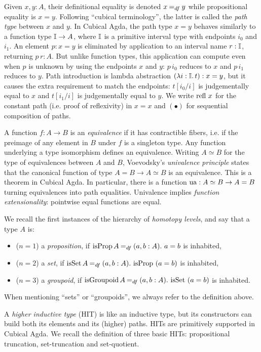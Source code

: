 \documentclass[a4paper,USenglish,cleveref]{lipics-v2021}
\begin{document}
Given $x, y : A$, their definitional equality is denoted $x \DefEq y$ while propositional equality is $x = y$.
Following ``cubical terminology'', the latter is called the \emph{path type} between $x$ and $y$.
In Cubical Agda, the path type $x = y$ behaves similarly to a function type $\mathbb{I} \to A$, where $\mathbb{I}$ is a primitive interval type with endpoints $i_0$ and $i_1$.
An element $p : x = y$ is eliminated by application to an interval name $r : \mathbb{I}$, returning $p \, r : A$.
But unlike function types, this application can compute even when $p$ is unknown by using the endpoints $x$ and $y$: $p \,i_0$ reduces to $x$ and $p \,i_1$ reduces to $y$.
Path introduction is lambda abstraction $(\lambda i : \mathbb{I}.\,t) : x = y$, but it causes the extra requirement to match the endpoints: $t[i_0 / i]$ is judgementally equal to $x$ and $t[i_1 / i]$ is judgementally equal to  $y$. We write $\Refl\,x$ for the constant path (i.e. proof of reflexivity) in $x = x$ and $(\bullet)$ for sequential composition of paths.

A function $f : A \to B$ is an \emph{equivalence} if it has contractible fibers, i.e. if the preimage of any element in $B$ under $f$ is a singleton type. Any function underlying a type isomorphism defines an equivalence. Writing $A \simeq B$ for the type of equivalences between $A$ and $B$, Voevodsky's \emph{univalence principle} states that the canonical function of type $A = B \to A \simeq B$ is an equivalence. This is a theorem in Cubical Agda. In particular, there is a function $\Op{ua} : A \simeq B \to A = B$ turning equivalences into path equalities. Univalence implies \emph{function extensionality}: pointwise equal functions are equal.

We recall the first instances of the hierarchy of \emph{homotopy levels}, and say that a type $A$ is:
\begin{itemize}
  \item[] ($n = 1$) a \emph{proposition}, if
    $\IsProp A \DefEq (a , b : A)\Where a = b$ is inhabited,
  \item[] ($n = 2$) a \emph{set}, if
    $\IsSet A \DefEq (a, b : A)\Where \IsProp \ (a = b)$ is inhabited,
  \item[] ($n = 3$) a \emph{groupoid}, if
    $\IsGpd A \DefEq (a, b : A)\Where \IsSet \ (a = b)$ is inhabited.
\end{itemize}
When mentioning \enquote{sets} or \enquote{groupoids}, we always refer to the definition above.

A \emph{higher inductive type} (HIT) is like an inductive type, but its constructors can build both its elements and its (higher) paths. HITs are primitively supported in Cubical Agda. We recall the definition of three basic HITs: propositional truncation, set-truncation and set-quotient. 
\end{document}
